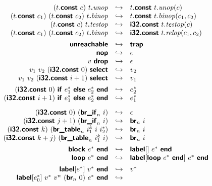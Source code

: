 \documentclass[a4paper]{scrartcl}
\newcommand\void[1]{}
\newcommand\x[1]{\ensuremath{\mathit{#1}}\xspace}
\newcommand\evalto{\hookrightarrow}
\newcommand\K[1]{\ensuremath{\textsf{#1}}}
\newcommand\KK[1]{\ensuremath{\K{\textbf{#1}}}}
\begin{document}
$$
\begin{array}{rcl}
(t.\KK{const}~c)~t\KK{.}\x{unop} &\evalto&
  t.\KK{const}~t.\x{unop}(c) \\
(t.\KK{const}~c_1)~(t.\KK{const}~c_2)~t\KK{.}\x{binop} &\evalto&
  t.\KK{const}~t.\x{binop}(c_1, c_2) \\
(t.\KK{const}~c)~t\KK{.}\x{testop} &\evalto&
  \KK{i32.const}~t.\x{testop}(c) \\
(t.\KK{const}~c_1)~(t.\KK{const}~c_2)~t\KK{.}\x{binop} &\evalto&
  \KK{i32.const}~t.\x{relop}(c_1, c_2) \\
[1ex]
\KK{unreachable} &\evalto&
  \KK{trap} \\
\KK{nop} &\evalto&
  \epsilon \\
v~\KK{drop} &\evalto&
  \epsilon \\
v_1~v_2~(\KK{i32.const}~0)~\KK{select} &\evalto&
  v_2 \\
v_1~v_2~(\KK{i32.const}~i+1)~\KK{select} &\evalto&
  v_1 \\
[1ex]
\void{
\KK{block}~v^\ast~\KK{end} &\evalto&
  v^\ast \\
\KK{block}~v^\ast~v^n~(\KK{br}_n~0)~e^\ast~\KK{end} &\evalto&
  v^n \\
\KK{block}~v^\ast~v^n~(\KK{br}_n~i+1)~e^\ast~\KK{end} &\evalto&
 v^n~(\KK{br}_n~i) \\
[1ex]
\KK{loop}~e^\ast~\KK{end} &\evalto&
  \KK{block}~e^\ast~\KK{end}~\KK{loop}~e^\ast~\KK{end} \\
[1ex]
}
(\KK{i32.const}~0)~\KK{if}~e_1^\ast~\KK{else}~e_2^\ast~\KK{end} &\evalto&
  e_2^\ast \\
(\KK{i32.const}~i+1)~\KK{if}~e_1^\ast~\KK{else}~e_2^\ast~\KK{end} &\evalto&
  e_1^\ast \\
[2ex]
(\KK{i32.const}~0)~(\KK{br\_if}_n~i) &\evalto&
  \epsilon \\
(\KK{i32.const}~j+1)~(\KK{br\_if}_n~i) &\evalto&
  \KK{br}_n~i \\
(\KK{i32.const}~k)~(\KK{br\_table}_n~i_1^k~i~i_2^\ast) &\evalto&
  \KK{br}_n~i \\
(\KK{i32.const}~k+j)~(\KK{br\_table}_n~i_1^k~i) &\evalto&
  \KK{br}_n~i \\
[1ex]
\KK{block}~e^\ast~\KK{end} &\evalto&
  \KK{label}[]~e^\ast~\KK{end} \\
\KK{loop}~e^\ast~\KK{end} &\evalto&
  \KK{label}[\KK{loop}~e^\ast~\KK{end}]~e^\ast~\KK{end} \\
[1ex]
\KK{label}[e^\ast]~v^\ast~\KK{end} &\evalto&
  v^\ast \\
\KK{label}[e_0^\ast]~v^\ast~v^n~(\KK{br}_n~0)~e^\ast~\KK{end} &\evalto&

\end{array}$$
\end{document}
